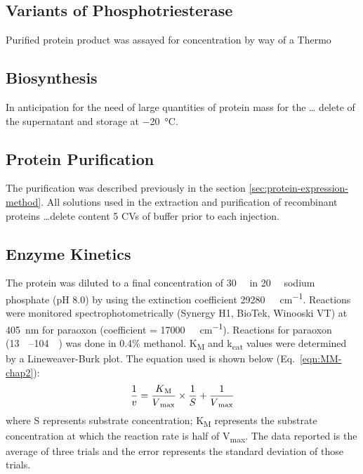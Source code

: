 \begin{refsection}
\subsection{Variants of Phosphotriesterase}
Purified protein product was assayed for concentration by way of a Thermo

\subsection{Biosynthesis}

In anticipation for the need of large quantities of protein mass for the \ldots
delete of the supernatant and storage at \SI{-20}{\celsius}.

\subsection{Protein Purification}
The purification was described previously in the section
\ref{sec:protein-expression-method}. All solutions used in the extraction and
purification of recombinant proteins \ldots delete content 5 CVs of buffer
prior to each injection.

\subsection{Enzyme Kinetics}

The protein was diluted to a final concentration of \SI{30}{\nano\Molar} in
\SI{20}{\milli\Molar} sodium phosphate (pH 8.0) by using the extinction
coefficient \SI{29280}{\per\Molar\per\cm}. Reactions were monitored
spectrophotometrically (Synergy H1, BioTek, Winooski VT) at \SI{405}{\nm} for
paraoxon (coefficient = \SI{17000}{\per\Molar\per\cm}).  Reactions for paraoxon
(\SIrange{13}{104}{\micro\Molar}) was done in 0.4\% methanol.
K\textsubscript{M} and k\textsubscript{cat} values were determined by a
Lineweaver-Burk plot.\cite{Baker2011b} The equation used is shown below
(Eq.~\ref{eqn:MM-chap2}): 
\begin{equation} 
    \frac{1}{v} =
    \frac{K\textsubscript{M}}{V\textsubscript{max}}\times\frac{1}{S} +
    \frac{1}{V\textsubscript{max}} 
    \label{eqn:MM-chap2}
\end{equation}
where S represents substrate concentration; K\textsubscript{M} represents the
substrate concentration at which the reaction rate is half of
V\textsubscript{max}. The data reported is the average of three trials and the
error represents the standard deviation of those trials.


\end{refsection}
